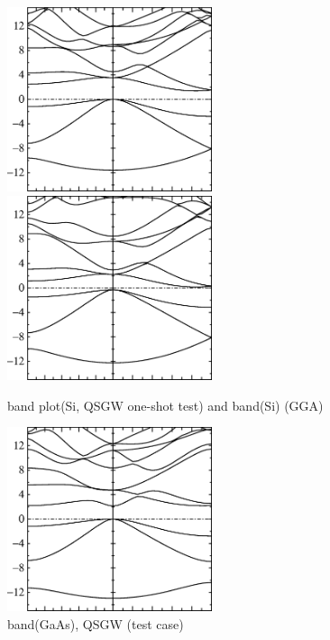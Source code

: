 \documentclass[a4paper,10pt,epsf,fleqn]{article}
\begin{document}
\begin{figure}[h]
 \begin{center}
  \includegraphics[width=60mm]{img/bandoneshotsi.eps}
  \includegraphics[width=60mm]{img/bandggasi.eps}
  \caption{band plot(Si, QSGW one-shot test)    and    band(Si) (GGA)}
 \end{center}
\end{figure}



\begin{figure}[hbtp]
  \includegraphics[width=60mm]{img/bandqsgwgaas.eps}
  \caption{band(GaAs), QSGW (test case)}
\end{figure}
\end{document}
